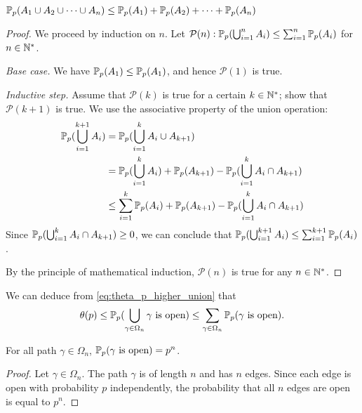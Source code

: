 \documentclass[a4paper, 12pt]{article}
\begin{document}
\begin{lem}\label{lem:union_bound}
$\mathbb{P}_p(A_1 \cup A_2 \cup \cdots \cup A_n) \leq \mathbb{P}_p(A_1) + \mathbb{P}_p(A_2) + \cdots + \mathbb{P}_p(A_n)$
\end{lem}
\begin{proof}[Proof]
We proceed by induction on $n$. Let $\mathcal{P}(n): \mathbb{P}_p(\bigcup_{i = 1}^n A_i) \leq \sum_{i = 1}^n \mathbb{P}_p(A_i)$ for  $n \in \mathbb{N}^*$.
\begin{description}
\item \textit{Base case. } We have $\mathbb{P}_p(A_1) \leq \mathbb{P}_p(A_1)$, and hence $\mathcal{P}(1)$ is true.
\item \textit{Inductive step. } Assume that $\mathcal{P}(k)$ is true for a certain $k \in \mathbb{N}^*$; show that $\mathcal{P}(k + 1)$ is true.
We use the associative property of the union operation:
\begin{align*}
    \mathbb{P}_p(\bigcup_{i = 1}^{k + 1} A_i) 
    &= \mathbb{P}_p(\bigcup_{i = 1}^{k} A_i \cup A_{k + 1})\\
    &= \mathbb{P}_p(\bigcup_{i = 1}^{k} A_i) + \mathbb{P}_p(A_{k + 1}) - \mathbb{P}_p(\bigcup_{i = 1}^{k} A_i \cap A_{k + 1})\\
    &\leq \sum_{i = 1}^k \mathbb{P}_p(A_i) + \mathbb{P}_p(A_{k + 1}) - \mathbb{P}_p(\bigcup_{i = 1}^{k} A_i \cap A_{k + 1})\\
\end{align*}
Since $\mathbb{P}_p(\bigcup_{i = 1}^{k} A_i \cap A_{k + 1}) \geq 0$, we can conclude that $\mathbb{P}_p(\bigcup_{i = 1}^{k + 1} A_i) \leq \sum_{i = 1}^{k + 1} \mathbb{P}_p(A_i)$.
\end{description}
By the principle of mathematical induction, $\mathcal{P}(n)$ is true for any $n \in \mathbb{N}^*$.
\end{proof}

We can deduce from \cref{eq:theta_p_higher_union} that
\begin{align}\label{eq:theta_p_higher_sum}
    \theta(p) \leq \mathbb{P}_p(\bigcup_{\gamma \in \Omega_n} \gamma \text{ is open}) \leq \sum_{\gamma \in \Omega_n} \mathbb{P}_p(\gamma \text{ is open}).
\end{align}

\begin{prop}\label{prop:path_open}
    For all path $\gamma \in \Omega_n$, $\mathbb{P}_p(\gamma \text{ is open}) = p^n$.
\end{prop}
\begin{proof}
    Let $\gamma \in \Omega_n$. The path $\gamma$ is of length $n$ and has $n$ edges. Since each edge is open with probability $p$ independently, the probability that all $n$ edges are open is equal to $p^n$.
\end{proof}
\end{document}
